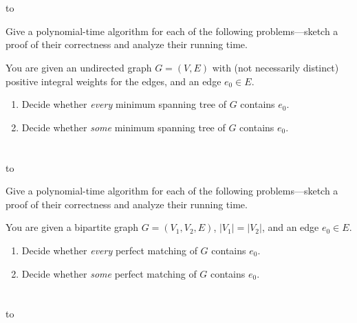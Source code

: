 \documentclass[a4paper,11pt]{book}
\newcounter{problem}
\begin{document}
\chapter*{}
\addtocounter{problem}{1}
\hbox to

\bigskip\noindent
Give a polynomial-time algorithm for each of the following problems---sketch
a proof of their correctness and analyze their running time.

You are given an undirected graph $G=(V,E)$ with (not necessarily distinct)
positive integral weights for the edges, and an edge $e_0\in E$.
\begin{enumerate}
  \itemsep 1pt
  \item
    Decide whether \emph{every} minimum spanning tree of $G$ contains $e_0$.
  \item
    Decide whether \emph{some} minimum spanning tree of $G$ contains $e_0$.
\end{enumerate}

\medskip


\chapter*{}
\addtocounter{problem}{1}
\hbox to

\bigskip\noindent
Give a polynomial-time algorithm for each of the following problems---sketch
a proof of their correctness and analyze their running time.

You are given a bipartite graph $G=(V_1, V_2, E)$, $|V_1|=|V_2|$, and an
edge $e_0\in E$.
\begin{enumerate}
  \itemsep 1pt
  \item
    Decide whether \emph{every} perfect matching of $G$ contains $e_0$.
  \item
    Decide whether \emph{some} perfect matching of $G$ contains $e_0$.
\end{enumerate}

\medskip


\chapter*{}
\addtocounter{problem}{1}
\hbox to
\end{document}

